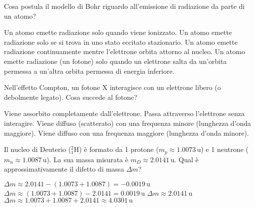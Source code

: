 \documentclass{exam}%
\begin{document}
\begin{questions}
\begin{multicols}{4}
\end{multicols}%
\question Cosa postula il modello di Bohr riguardo all'emissione di radiazione da parte di un atomo?%
\vspace{0.2em}%
\begin{choices}%
\choice Un atomo emette radiazione solo quando viene ionizzato.%
\choice Un atomo emette radiazione solo se si trova in uno stato eccitato stazionario.%
\choice Un atomo emette radiazione continuamente mentre l'elettrone orbita attorno al nucleo.%
\choice Un atomo emette radiazione (un fotone) solo quando un elettrone salta da un'orbita permessa a un'altra orbita permessa di energia inferiore.%
\end{choices}%
\question Nell'effetto Compton, un fotone X interagisce con un elettrone libero (o debolmente legato). Cosa succede al fotone?%
\vspace{0.2em}%
\begin{choices}%
\choice Viene assorbito completamente dall'elettrone.%
\choice Passa attraverso l'elettrone senza interagire.%
\choice Viene diffuso (scatterato) con una frequenza minore (lunghezza d'onda maggiore).%
\choice Viene diffuso con una frequenza maggiore (lunghezza d'onda minore).%
\end{choices}%
\question Il nucleo di Deuterio ($^2_1\text{H}$) è formato da 1 protone ($m_p \approx 1.0073 \, \text{u}$) e 1 neutrone ($m_n \approx 1.0087 \, \text{u}$). La sua massa misurata è $m_D \approx 2.0141 \, \text{u}$. Qual è approssimativamente il difetto di massa $\Delta m$?%
\vspace{0.2em}%
\begin{multicols}{2}%
\begin{choices}%
\choice $\Delta m \approx 2.0141 - (1.0073 + 1.0087) = -0.0019 \, \text{u}$%
\choice $\Delta m \approx (1.0073 + 1.0087) - 2.0141 = 0.0019 \, \text{u}$%
\choice $\Delta m \approx 2.0141 \, \text{u}$%
\choice $\Delta m \approx 1.0073 + 1.0087 + 2.0141 \approx 4.0301 \, \text{u}$%
\end{choices}%
\end{multicols}%
\end{questions}%
\end{document}
